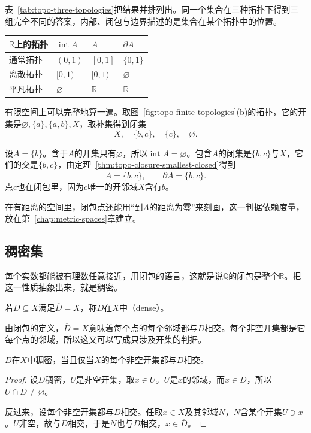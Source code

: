 表~\ref{tab:topo-three-topologies}把结果并排列出。同一个集合在三种拓扑下得到三组完全不同的答案，内部、闭包与边界描述的是集合在某个拓扑中的位置。

\begin{BookInlineTable}
  \centering
  \begin{tabular}{@{}llll@{}}
    \toprule
    $\mathbb R$上的拓扑 & $\operatorname{int}A$ & $\overline A$ & $\partial A$\\
    \midrule
    通常拓扑 & $(0,1)$ & $[0,1]$ & $\{0,1\}$\\
    离散拓扑 & $[0,1)$ & $[0,1)$ & $\varnothing$\\
    平凡拓扑 & $\varnothing$ & $\mathbb R$ & $\mathbb R$\\
    \bottomrule
  \end{tabular}
  \caption{集合$A=[0,1)$在三种拓扑下的内部、闭包与边界。}
  \label{tab:topo-three-topologies}
\end{BookInlineTable}

有限空间上可以完整地算一遍。取图~\ref{fig:topo-finite-topologies}(b)的拓扑，它的开集是$\varnothing,\{a\},\{a,b\},X$，取补集得到闭集
\[
 X,\quad\{b,c\},\quad\{c\},\quad\varnothing.
\]

设$A=\{b\}$。含于$A$的开集只有$\varnothing$，所以$\operatorname{int}A=\varnothing$。包含$A$的闭集是$\{b,c\}$与$X$，它们的交是$\{b,c\}$，由定理~\ref{thm:topo-closure-smallest-closed}得到
\[
 \overline A=\{b,c\},\qquad\partial A=\{b,c\}.
\]
点$c$也在闭包里，因为$c$唯一的开邻域$X$含有$b$。

在有距离的空间里，闭包点还能用“到$A$的距离为零”来刻画，这一判据依赖度量，放在第~\ref{chap:metric-spaces}章建立。

\subsection{稠密集}
\label{sec:topo-dense-sets}

每个实数都能被有理数任意接近，用闭包的语言，这就是说$\mathbb Q$的闭包是整个$\mathbb R$。把这一性质抽象出来，就是稠密。

\begin{definition}[稠密集]
\label{def:topo-dense}
若$D\subseteq X$满足$\overline D=X$，称$D$在$X$中（dense）。
\end{definition}

由闭包的定义，$\overline D=X$意味着每个点的每个邻域都与$D$相交。每个非空开集都是它每个点的邻域，所以这又可以写成只涉及开集的判据。

\begin{theorem}[稠密的开集判据]
\label{thm:topo-dense-open-criterion}
$D$在$X$中稠密，当且仅当$X$的每个非空开集都与$D$相交。
\end{theorem}
\begin{proof}
设$D$稠密，$U$是非空开集，取$x\in U$。$U$是$x$的邻域，而$x\in\overline D$，所以$U\cap D\neq\varnothing$。

反过来，设每个非空开集都与$D$相交。任取$x\in X$及其邻域$N$，$N$含某个开集$U\ni x$。$U$非空，故与$D$相交，于是$N$也与$D$相交，$x\in\overline D$。
\end{proof}

